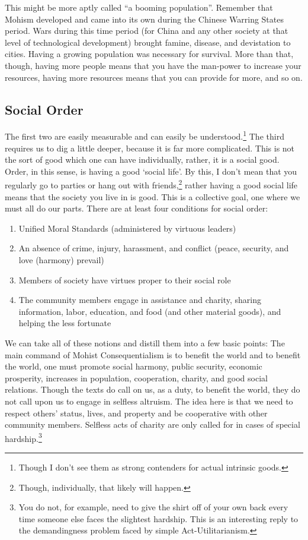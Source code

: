 This might be more aptly called ``a booming population''. Remember that Mohism developed and came into its own during the Chinese Warring States period. Wars during this time period (for China and any other society at that level of technological development) brought famine, disease, and devistation to cities. Having a growing population was necessary for survival. More than that, though, having more people means that you have the man-power to increase your resources, having more resources means that you can provide for more, and so on.

\subsection{Social Order}

The first two are easily measurable and can easily be understood.\footnote{Though I don't see them as strong contenders for actual intrinsic goods.} The third requires us to dig a little deeper, because it is far more complicated. This is not the sort of good which one can have individually, rather, it is a social good. Order, in this sense, is having a good `social life'. By this, I don't mean that you regularly go to parties or hang out with friends,\footnote{Though, individually, that likely will happen.} rather having a good social life means that the society you live in is good. This is a collective goal, one where we must all do our parts. There are at least four conditions for social order:

\begin{enumerate}
\item Unified Moral Standards (administered by virtuous leaders)
\item An absence of crime, injury, harassment, and conflict (peace, security, and love (harmony) prevail)
\item Members of society have virtues proper to their social role
\item The community members engage in assistance and charity, sharing information, labor, education, and food (and other material goods), and helping the less fortunate
\end{enumerate}

We can take all of these notions and distill them into a few basic points: The main command of Mohist Consequentialism is to benefit the world and to benefit the world, one must promote social harmony, public security, economic prosperity, increases in population, cooperation, charity, and good social relations. Though the texts do call on us, as a duty, to benefit the world, they do not call upon us to engage in selfless altruism. The idea here is that we need to respect others' status, lives, and property and be cooperative with other community members. Selfless acts of charity are only called for in cases of special hardship.\footnote{You do not, for example, need to give the shirt off of your own back every time someone else faces the slightest hardship. This is an interesting reply to the demandingness problem faced by simple Act-Utilitarianism.} 

